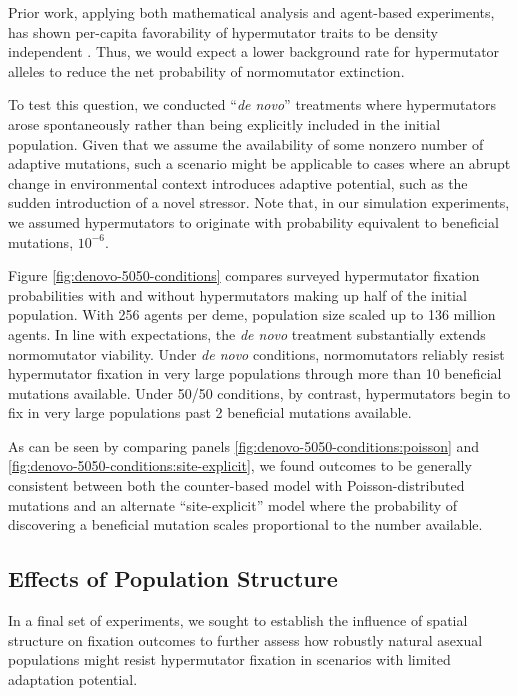 Prior work, applying both mathematical analysis and agent-based experiments, has shown per-capita favorability of hypermutator traits to be density independent \citep{raynes2019selection}.
Thus, we would expect a lower background rate for hypermutator alleles to reduce the net probability of normomutator extinction.

To test this question, we conducted ``\textit{de novo}'' treatments where hypermutators arose spontaneously rather than being explicitly included in the initial population.
Given that we assume the availability of some nonzero number of adaptive mutations, such a scenario might be applicable to cases where an abrupt change in environmental context introduces adaptive potential, such as the sudden introduction of a novel stressor.
Note that, in our simulation experiments, we assumed hypermutators to originate with probability equivalent to beneficial mutations, $10^{-6}$.

Figure \ref{fig:denovo-5050-conditions} compares surveyed hypermutator fixation probabilities with and without hypermutators making up half of the initial population.
With 256 agents per deme, population size scaled up to 136 million agents.
In line with expectations, the \textit{de novo} treatment substantially extends normomutator viability.
Under \textit{de novo} conditions, normomutators reliably resist hypermutator fixation in very large populations through more than 10 beneficial mutations available.
Under 50/50 conditions, by contrast, hypermutators begin to fix in very large populations past 2 beneficial mutations available.

As can be seen by comparing panels \ref{fig:denovo-5050-conditions:poisson} and \ref{fig:denovo-5050-conditions:site-explicit}, we found outcomes to be generally consistent between both the counter-based model with Poisson-distributed mutations and an alternate ``site-explicit'' model where the probability of discovering a beneficial mutation scales proportional to the number available.

\subsection{Effects of Population Structure}
\label{sec:population-structure}

In a final set of experiments, we sought to establish the influence of spatial structure on fixation outcomes to further assess how robustly natural asexual populations might resist hypermutator fixation in scenarios with limited adaptation potential.

